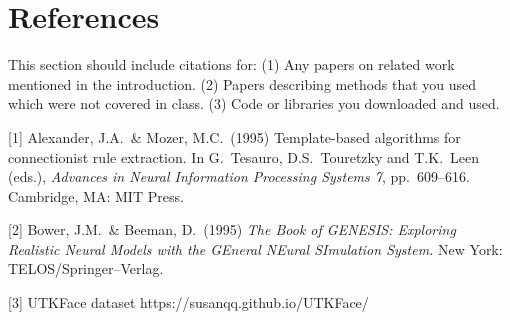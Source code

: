 \documentclass{article}
\begin{document}
\section*{References}
This section should include citations for: (1) Any papers on related work mentioned in the introduction.
(2) Papers describing methods that you used which were not covered in class.
(3) Code or libraries you downloaded and used.

\medskip
\small
[1] Alexander, J.A.\ \& Mozer, M.C.\ (1995) Template-based algorithms
for connectionist rule extraction. In G.\ Tesauro, D.S.\ Touretzky and
T.K.\ Leen (eds.), {\it Advances in Neural Information Processing
  Systems 7}, pp.\ 609--616. Cambridge, MA: MIT Press.

[2] Bower, J.M.\ \& Beeman, D.\ (1995) {\it The Book of GENESIS:
  Exploring Realistic Neural Models with the GEneral NEural SImulation
  System.}  New York: TELOS/Springer--Verlag.

[3] UTKFace dataset https://susanqq.github.io/UTKFace/
\end{document}
